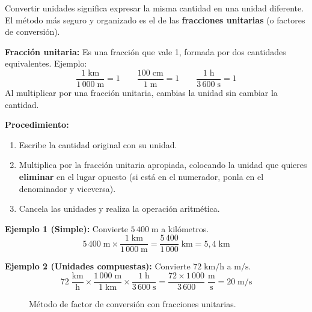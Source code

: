 \documentclass[12pt, a4paper]{article}
\begin{document}
Convertir unidades significa expresar la misma cantidad en una unidad diferente. El método más seguro y organizado es el de las \textbf{fracciones unitarias} (o factores de conversión).

\begin{cuadroteoria}
\textbf{Fracción unitaria:} Es una fracción que vale 1, formada por dos cantidades equivalentes. Ejemplo:
$$\frac{1\;\text{km}}{1\,000\;\text{m}} = 1 \qquad \frac{100\;\text{cm}}{1\;\text{m}} = 1 \qquad \frac{1\;\text{h}}{3\,600\;\text{s}} = 1$$
Al multiplicar por una fracción unitaria, cambias la unidad sin cambiar la cantidad.
\end{cuadroteoria}

\begin{cuadrosolucion}
\textbf{Procedimiento:}
\begin{enumerate}[leftmargin=*]
  \item Escribe la cantidad original con su unidad.
  \item Multiplica por la fracción unitaria apropiada, colocando la unidad que quieres \textbf{eliminar} en el lugar opuesto (si está en el numerador, ponla en el denominador y viceversa).
  \item Cancela las unidades y realiza la operación aritmética.
\end{enumerate}
\end{cuadrosolucion}

\noindent\textbf{Ejemplo 1 (Simple):} Convierte $5\,400\;\text{m}$ a kilómetros.
$$5\,400\;\text{m} \times \frac{1\;\text{km}}{1\,000\;\text{m}} = \frac{5\,400}{1\,000}\;\text{km} = 5{,}4\;\text{km}$$

\noindent\textbf{Ejemplo 2 (Unidades compuestas):} Convierte $72\;\text{km/h}$ a $\text{m/s}$.
$$72\;\frac{\text{km}}{\text{h}} \times \frac{1\,000\;\text{m}}{1\;\text{km}} \times \frac{1\;\text{h}}{3\,600\;\text{s}} = \frac{72 \times 1\,000}{3\,600}\;\frac{\text{m}}{\text{s}} = 20\;\text{m/s}$$

\begin{figure}[h!]
  \centering
  \caption{Método de factor de conversión con fracciones unitarias.}
  \label{fig:conversion}
\end{figure}
\end{document}
